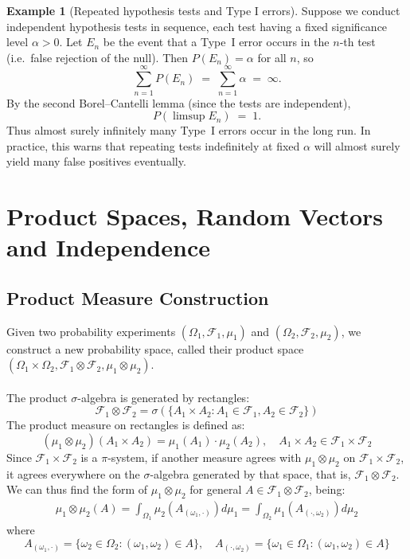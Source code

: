 \documentclass[11pt,a4paper]{article}
\theoremstyle{definition}
\newtheorem{example}{Example}[section]
\begin{document}
\begin{example}[Repeated hypothesis tests and Type I errors]
Suppose we conduct independent hypothesis tests in sequence, each test having a fixed significance level $\alpha>0$.  Let $E_n$ be the event that a Type~I error occurs in the $n$-th test (i.e.\ false rejection of the null).  Then $P(E_n)=\alpha$ for all $n$, so 
\[
\sum_{n=1}^\infty P(E_n) \;=\; \sum_{n=1}^\infty \alpha \;=\; \infty.
\]
By the second Borel--Cantelli lemma (since the tests are independent), 
\[
P(\limsup E_n) \;=\; 1.
\]
Thus almost surely infinitely many Type~I errors occur in the long run.  In practice, this warns that repeating tests indefinitely at fixed $\alpha$ will almost surely yield many false positives eventually.
\end{example}

\newpage

\section{Product Spaces, Random Vectors and Independence}

\subsection{Product Measure Construction}

Given two probability experiments $(\Omega_1, \mathcal{F}_1, \mu_1)$ and $(\Omega_2, \mathcal{F}_2, \mu_2)$, we construct a new probability space, called their product space $(\Omega_1 \times \Omega_2, \mathcal{F}_1 \otimes \mathcal{F}_2, \mu_1 \otimes \mu_2)$.
~\\ ~\\
The product $\sigma$-algebra is generated by rectangles:
\[\mathcal{F}_1 \otimes \mathcal{F}_2 = \sigma(\{A_1 \times A_2 : A_1 \in \mathcal{F}_1, A_2 \in \mathcal{F}_2\})\]
The product measure on rectangles is defined as:
\[(\mu_1 \otimes \mu_2)(A_1 \times A_2) = \mu_1(A_1) \cdot \mu_2(A_2), \quad A_1 \times A_2 \in \mathcal{F}_1 \times \mathcal{F}_2\]
Since $\mathcal{F}_1 \times \mathcal{F}_2$ is a $\pi$-system, if another measure agrees with $\mu_1 \otimes \mu_2$ on $\mathcal{F}_1 \times \mathcal{F}_2$, it agrees everywhere on the $\sigma$-algebra generated by that space, that is, $\mathcal{F}_1 \otimes \mathcal{F}_2$. We can thus find the form of $\mu_1 \otimes \mu_2$ for general $A \in \mathcal{F}_1 \otimes \mathcal{F}_2$, being: \begin{align} \label{ref:construct}
\mu_1 \otimes \mu_2 (A) = \int _{\Omega_1 } \mu_2(A_{(\omega_1, \cdot)}) d \mu _1 = \int _{\Omega_2 } \mu_1(A_{(\cdot, \omega_2)}) d \mu _2
\end{align}
where \[
A_{(\omega_1, \cdot)} = \{\omega_2 \in \Omega_2: (\omega_1, \omega_2) \in A\}, \quad A_{(\cdot, \omega_2)} = \{\omega_1 \in \Omega_1: (\omega_1, \omega_2) \in A\}
\]
\end{document}
